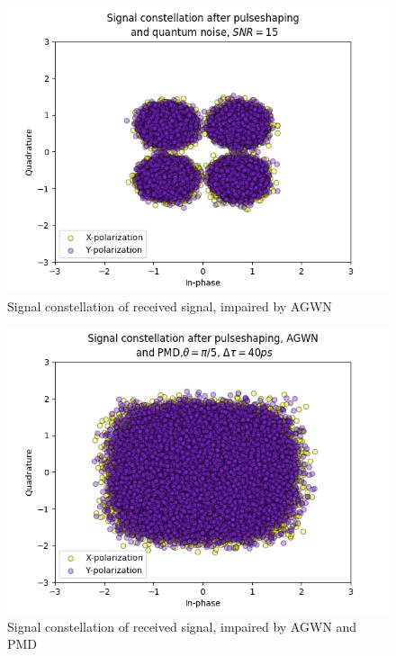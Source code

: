 \documentclass[journal,10pt,twoside, a4paper]{IEEEtran}
\begin{document}
\begin{figure}
    \centering
    \includegraphics[width=\linewidth]{Thesis/images/sig_agwn}
    \caption{Signal constellation of received signal, impaired by AGWN}
    \label{fig:sig_agwn}
\end{figure}

\begin{figure}
    \centering
    \includegraphics[width=\linewidth]{Thesis/images/sig_agwn_pmd}
    \caption{Signal constellation of received signal, impaired by AGWN and PMD}
    \label{fig:sig_agwn_pmd}
\end{figure}
\end{document}

